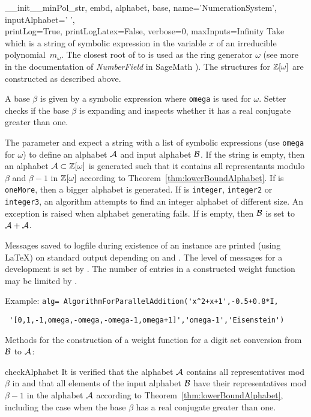 \begin{method}{\_\_init\_\_}{minPol\_str, embd, alphabet, base, name='NumerationSystem', inputAlphabet=' ',\\
 printLog=True, printLogLatex=False, verbose=0, maxInputs=Infinity}
Take  which is a string of symbolic expression in the variable $x$ of an irreducible polynomial~$m_\omega$. The closest root of   to  is used as the ring generator $\omega$ (see more in the documentation of \emph{NumberField} in SageMath \cite{sage}). The structures for $\mathbb{Z}[\omega]$ are constructed as described above. 

A base $\beta$ is given by a symbolic expression  where \verb+omega+ is used for $\omega$.
Setter  checks if the base $\beta$ is expanding and inspects whether it has a real conjugate greater than one.

The parameter  and  expect a string with a list of symbolic expressions (use \verb+omega+ for $\omega$) to define an alphabet $\mathcal{A}$ and input alphabet $\mathcal{B}$. If the string  is empty, then an alphabet $\mathcal{A}\subset\mathbb{Z}[\omega]$ is generated such that it contains all representants modulo $\beta$ and $\beta-1$ in $\mathbb{Z}[\omega]$ according to Theorem~\ref{thm:lowerBoundAlphabet}. If  is \verb+oneMore+, then a bigger alphabet is generated.  If  is \verb+integer+, \verb+integer2+ or \verb+integer3+, an algorithm attempts to find an integer alphabet of different size. An exception is raised when alphabet generating fails. If   is empty, then $\mathcal{B}$ is set to $\mathcal{A}+\mathcal{A}$.

Messages saved to logfile during existence of an instance are printed (using \LaTeX) on standard output depending on  and . The level of messages for a development is set by . The number of entries in a constructed weight function may be limited by .

Example:
\verb|alg= AlgorithmForParallelAddition('x^2+x+1',-0.5+0.8*I,|

\verb| '[0,1,-1,omega,-omega,-omega-1,omega+1]','omega-1','Eisenstein')|
\end{method}

Methods for the construction of a weight function for a digit set conversion from $\mathcal{B}$ to $\mathcal{A}$:
\begin{method}{checkAlphabet}{}
It is verified that the alphabet $\mathcal{A}$ contains all representatives mod $\beta$ in  and that all elements of the input alphabet $\mathcal{B}$ have their representatives mod $\beta-1$ in the alphabet $\mathcal{A}$ according to Theorem~\ref{thm:lowerBoundAlphabet}, including the case when the base $\beta$ has a real conjugate greater than one.
\end{method}


